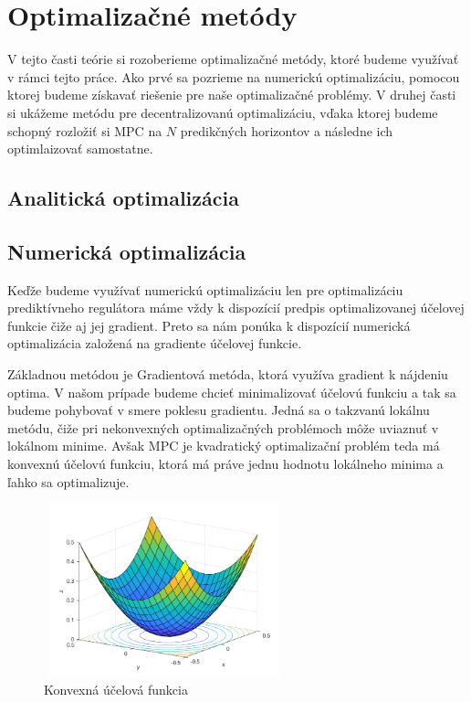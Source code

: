 \section{Optimalizačné metódy}
\label{se:optimalizacia}

V tejto časti teórie si rozoberieme optimalizačné metódy, ktoré budeme využívať v rámci tejto práce. Ako prvé sa pozrieme na numerickú optimalizáciu, pomocou ktorej budeme získavať riešenie pre naše optimalizačné problémy. V druhej časti si ukážeme metódu pre decentralizovanú optimalizáciu, vďaka ktorej budeme schopný rozložiť si MPC na $N$ predikčných horizontov a následne ich optimlaizovať samostatne. 
\subsection{Analitická optimalizácia}


\subsection{Numerická optimalizácia}
Keďže budeme využívať numerickú optimalizáciu len pre optimalizáciu prediktívneho regulátora máme vždy k dispozícií predpis optimalizovanej účelovej funkcie čiže aj jej gradient. Preto sa nám ponúka k dispozícií numerická optimalizácia založená na gradiente účelovej funkcie. 

Základnou metódou je Gradientová metóda, ktorá využíva gradient k nájdeniu optima. V našom prípade budeme chcieť minimalizovať účelovú funkciu a tak sa budeme pohybovať v smere poklesu gradientu. Jedná sa o takzvanú lokálnu metódu, čiže pri nekonvexných optimalizačných problémoch môže uviaznuť v lokálnom minime. Avšak MPC je kvadratický optimalizační problém teda má konvexnú účelovú funkciu, ktorá má práve jednu hodnotu lokálneho minima a ľahko sa optimalizuje. 

\begin{figure}[H]
	\centering
	\includegraphics[width=7cm,height=5cm]{images/Konvexna_funkcia}
	\caption{Konvexná účelová funkcia}
\end{figure}

